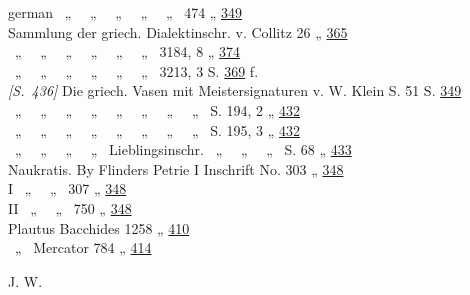 \begin{otherlanguage*}{german}
\phantom{a}~„~ ~„~ ~„~ ~„~ ~„~ 474 \dotfill „ \hyperlink{p349}{349}\\
Sammlung der griech. Dialektinschr. v. Collitz 26 \dotfill „ \hyperlink{p365}{365}\\
\phantom{a}~„~ ~„~ ~„~ ~„~ ~„~ ~„~ 3184, 8 \dotfill „ \hyperlink{p374}{374}\\
\phantom{a}~„~ ~„~ ~„~ ~„~ ~„~ ~„~ 3213, 3 \dotfill S. \hyperlink{p369}{369} f.\\
\hypertarget{p436}{\emph{[S.~436]}}\label{p436} Die griech. Vasen mit Meistersignaturen v. W. Klein S. 51 \dotfill S. \hyperlink{p349}{349}\\
\phantom{a}~„~ ~„~ ~„~ ~„~ ~„~ ~„~ ~„~ ~„~ S. 194, 2 \dotfill „ \hyperlink{p432}{432}\\
\phantom{a}~„~ ~„~ ~„~ ~„~ ~„~ ~„~ ~„~ ~„~ S. 195, 3 \dotfill „ \hyperlink{p432}{432}\\
\phantom{a}~„~ ~„~ ~„~ ~„~ Lieblingsinschr. ~„~ ~„~ ~„~ S. 68 \dotfill „ \hyperlink{p433}{433}\\
Naukratis. By Flinders Petrie I Inschrift No. 303 \dotfill „ \hyperlink{p348}{348}\\
\phantom{Naukratis. By Flinders Petrie} I ~„~ ~„~ 307 \dotfill „ \hyperlink{p348}{348}\\
\phantom{Naukratis. By Flinders Petrie} II ~„~ ~„~ 750 \dotfill „ \hyperlink{p348}{348}\\
Plautus Bacchides 1258 \dotfill „ \hyperlink{p410}{410}\\
\phantom{a}~„~ Mercator 784 \dotfill „ \hyperlink{p414}{414}

\hfill J. W. \hspace{1ex}







\end{otherlanguage*}
